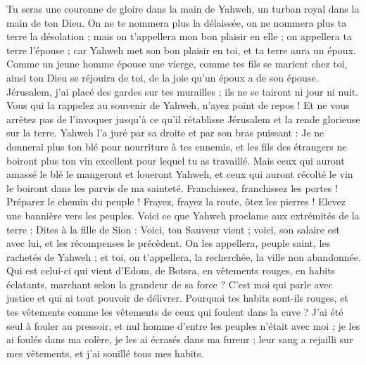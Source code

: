 \begin{multicols}{2}
Tu seras une couronne de gloire dans la main de Yahweh, un turban royal dans la main de ton Dieu.
On ne te nommera plus la délaissée, on ne nommera plus ta terre la désolation ; mais on t'appellera mon bon plaisir en elle ; on appellera ta terre l'épouse ; car Yahweh met son bon plaisir en toi, et ta terre aura un époux.
Comme un jeune homme épouse une vierge, comme tes fils se marient chez toi, ainsi ton Dieu se réjouira de toi, de la joie qu'un époux a de son épouse.
Jérusalem, j'ai placé des gardes sur tes murailles ; ils ne se tairont ni jour ni nuit. Vous qui la rappelez au souvenir de Yahweh, n'ayez point de repos !
Et ne vous arrêtez pas de l'invoquer jusqu'à ce qu'il rétablisse Jérusalem et la rende glorieuse sur la terre.
Yahweh l'a juré par sa droite et par son bras puissant : Je ne donnerai plus ton blé pour nourriture à tes ennemis, et les fils des étrangers ne boiront plus ton vin excellent pour lequel tu as travaillé.
Mais ceux qui auront amassé le blé le mangeront et loueront Yahweh, et ceux qui auront récolté le vin le boiront dans les parvis de ma sainteté.
Franchissez, franchissez les portes ! Préparez le chemin du peuple ! Frayez, frayez la route, ôtez les pierres ! Elevez une bannière vers les peuples.
Voici ce que Yahweh proclame aux extrémités de la terre : Dites à la fille de Sion : Voici, ton Sauveur vient ; voici, son salaire est avec lui, et les récompenses le précèdent.
On les appellera, peuple saint, les rachetés de Yahweh ; et toi, on t'appellera, la recherchée, la ville non abandonnée.
\VerseOne{}Qui est celui-ci qui vient d'Edom, de Botsra, en vêtements rouges, en habits éclatants, marchant selon la grandeur de sa force ? C'est moi qui parle avec justice et qui ai tout pouvoir de délivrer.
Pourquoi tes habits sont-ils rouges, et tes vêtements comme les vêtements de ceux qui foulent dans la cuve ?
J'ai été seul à fouler au pressoir, et nul homme d'entre les peuples n'était avec moi ; je les ai foulés dans ma colère, je les ai écrasés dans ma fureur ; leur sang a rejailli sur mes vêtements, et j'ai souillé tous mes habits.

\end{multicols}
